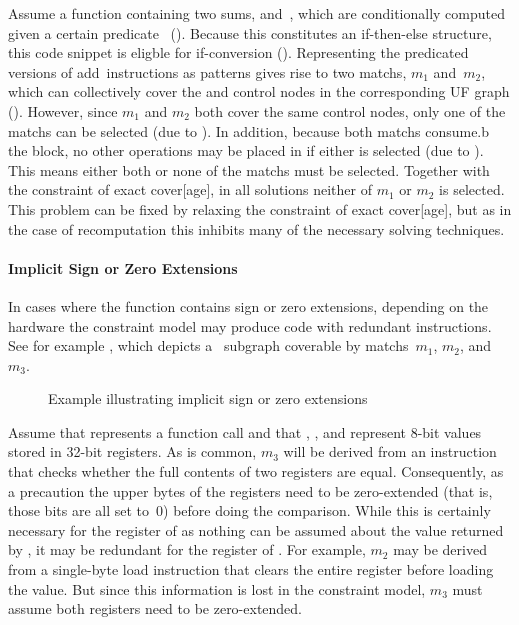 %
Assume a \gls{function} containing two sums,  and~, which
are conditionally computed given a certain predicate~
().
%
Because this constitutes an if-then-else structure, this code snippet is eligble
for \gls{if-conversion} ().
%
Representing the predicated versions of add~\glspl{instruction} as
\glspl{pattern} gives rise to two \glspl{match}, $m_1$ and~$m_2$, which can
collectively cover the  and \glspl{control node} in
the corresponding \gls{UF graph} ().
%
However, since $m_1$ and $m_2$ both cover the same \glspl{control node}, only
one of the \glspl{match} can be selected (due to
).
%
In addition, because both \glspl{match} \gls{consume.b} the 
\gls{block}, no other \glspl{operation} may be placed in  if
either is selected (due to ).
%
This means either both or none of the \glspl{match} must be selected.
%
Together with the \gls{constraint} of exact \gls{cover}[age], in all
\glspl{solution} neither of $m_1$ or $m_2$ is selected.
%
This problem can be fixed by relaxing the \gls{constraint} of exact
\gls{cover}[age], but as in the case of \gls{recomputation} this inhibits many
of the necessary solving techniques.


\paragraph{Implicit Sign or Zero Extensions}

In cases where the \gls{function} contains sign or zero extensions, depending on
the hardware the \gls{constraint model} may produce code with redundant
\glspl{instruction}.
%
See for example , which depicts a
~\gls{subgraph} coverable by \glspl{match}~$m_1$, $m_2$,
and~$m_3$.
%
\begin{figure}
  \centering%
  

  \caption{Example illustrating implicit sign or zero extensions}%
\end{figure}
%
Assume that  represents a \gls{function} call and that ,
, and  represent \num{8}-bit values stored in \num{32}-bit
\glspl{register}.
%
As is common, $m_3$ will be derived from an \gls{instruction} that checks
whether the full contents of two \glspl{register} are equal.
%
Consequently, as a precaution the upper bytes of the \glspl{register} need to be
zero-extended (that is, those bits are all set to~\num{0}) before doing the
comparison.
%
While this is certainly necessary for the \gls{register} of  as
nothing can be assumed about the value returned by , it may be
redundant for the register of .
%
For example, $m_2$ may be derived from a single-byte load \gls{instruction} that
clears the entire \gls{register} before loading the value.
%
But since this information is lost in the \gls{constraint model}, $m_3$ must
assume both \glspl{register} need to be zero-extended.


